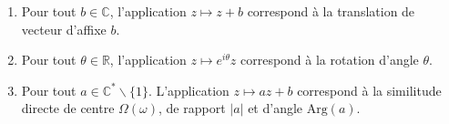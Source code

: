 \documentclass{article}
\begin{document}
\begin{adjustwidth}{-3cm}{-3cm}


\newenvironment{enumeratebf}{
    \begin{enumerate}[label=\textbf{\arabic*.}]
}
{
    \end{enumerate}
}

\newcommand{\notion}[1]{\textcolor{vert_fonce}{\textit{#1}}}
\newcommand{\mb}[1]{\mathbb{#1}}
\newcommand{\mc}[1]{\mathcal{#1}}
\newcommand{\code}[1]{\texttt{#1}}
\newcommand{\ccode}[1]{\texttt{|#1|}}
\newcommand{\ov}[1]{\overline{#1}}
\newcommand{\abs}[1]{|#1|}
\newcommand{\rev}[1]{\texttt{reverse(#1)}}
\newcommand{\crev}[1]{\texttt{|reverse(#1)|}}

\newcommand{\ie}{\textit{i.e.} }

\newcommand{\N}{\mathbb{N}}
\newcommand{\R}{\mathbb{R}}
\newcommand{\C}{\mathbb{C}}
\newcommand{\K}{\mathbb{K}}

\newcommand{\A}{\mathcal{A}}
\newcommand{\bigO}{\mathcal{O}}

\newcommand{\intint}[2]{\llbracket #1,#2 \rrbracket}
\newcommand{\seg}[2]{[#1\, ; \, #2]}
\newcommand{\mat}[1]{\text{Mat}_{#1}}
\newcommand{\matrice}[1]{\mathcal{M}_{#1}}


\begin{enumeratebf}
    \item Pour tout $b \in \C$, l'application $z \mapsto z + b$ correspond à la translation de vecteur d'affixe $b$.
    \item Pour tout $\theta \in \R$, l'application $z \mapsto e^{i\theta}z$ correspond à la rotation d'angle $\theta$.
    \item Pour tout $a \in \C^*\backslash\{1\}$. L'application $z \mapsto az+b$ correspond à la similitude directe de centre $\Omega(\omega)$, de rapport $\abs{a}$ et d'angle $\text{Arg}(a)$.
\end{enumeratebf}


\end{adjustwidth}
\end{document}
